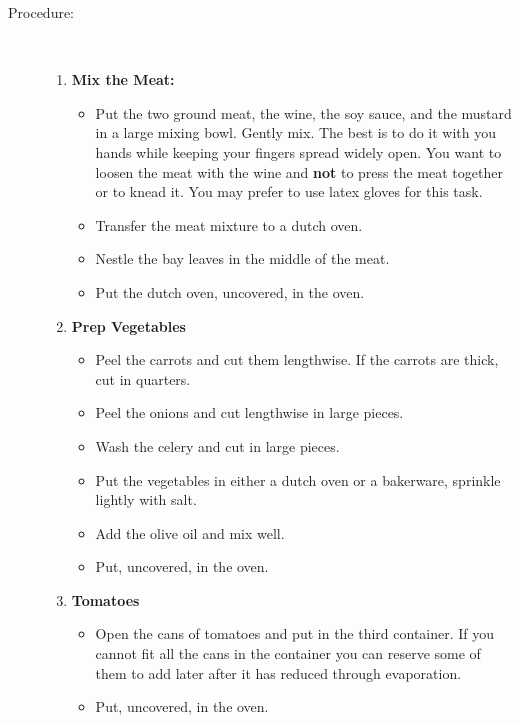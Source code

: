 \documentclass[11pt,letterpaper]{article}
\begin{document}
\begin{description}
\item[Procedure:]\ \\
	\begin{enumerate}
	\item {\bf Mix the Meat:}
		\begin{itemize}
		\item Put the two ground meat, the wine, the soy sauce, and the mustard in a large mixing bowl. Gently mix. The best is to do it with you hands while keeping your fingers spread widely open. You want to loosen the meat with the wine and {\bf not} to press the meat together or to knead it. You may prefer to use latex gloves for this task.
		\item Transfer the meat mixture to a dutch oven.
		\item Nestle the bay leaves in the middle of the meat.
		\item Put the dutch oven, uncovered, in the oven.
		\end{itemize}
	\item {\bf Prep Vegetables}
		\begin{itemize}
		\item Peel the carrots and cut them lengthwise. If the carrots are thick, cut in quarters.
		\item Peel the onions and cut lengthwise in large pieces.
		\item Wash the celery and cut in large pieces.
		\item Put the vegetables in either a dutch oven or a bakerware, sprinkle lightly with salt.
		\item Add the olive oil and mix well.
		\item Put, uncovered, in the oven.
		\end{itemize}
	\item{\bf Tomatoes}
		\begin{itemize}
		\item Open the cans of tomatoes and put in the third container. If you cannot fit all the cans in the container you can reserve some of them to add later after it has reduced through evaporation.
		\item Put, uncovered, in the oven.
		\end{itemize}


\end{enumerate}
\end{description}
\end{document}
